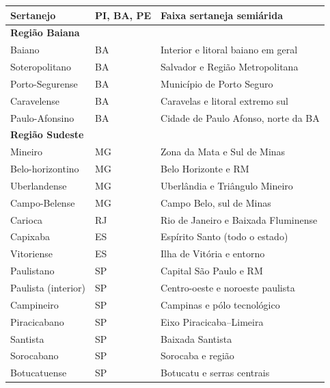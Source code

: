 \begin{table}[ht]
\begin{tabular}{lll}
Sertanejo             & PI, BA, PE          & Faixa sertaneja semiárida          \\
\hline
\multicolumn{3}{l}{\textbf{Região Baiana}} \\ \hline
Baiano          & BA & Interior e litoral baiano em geral      \\
Soteropolitano  & BA & Salvador e Região Metropolitana         \\
Porto-Segurense & BA & Município de Porto Seguro               \\
Caravelense     & BA & Caravelas e litoral extremo sul         \\
Paulo-Afonsino  & BA & Cidade de Paulo Afonso, norte da BA     \\
\hline
\multicolumn{3}{l}{\textbf{Região Sudeste}} \\ \hline
Mineiro           & MG                     & Zona da Mata e Sul de Minas           \\
Belo-horizontino  & MG                     & Belo Horizonte e RM                   \\
Uberlandense      & MG                     & Uberlândia e Triângulo Mineiro        \\
Campo-Belense     & MG                     & Campo Belo, sul de Minas              \\
Carioca           & RJ                     & Rio de Janeiro e Baixada Fluminense   \\
Capixaba          & ES                     & Espírito Santo (todo o estado)        \\
Vitoriense        & ES                     & Ilha de Vitória e entorno             \\
Paulistano        & SP                     & Capital São Paulo e RM                \\
Paulista (interior)& SP                    & Centro-oeste e noroeste paulista      \\
Campineiro        & SP                     & Campinas e pólo tecnológico           \\
Piracicabano      & SP                     & Eixo Piracicaba–Limeira               \\
Santista          & SP                     & Baixada Santista                      \\
Sorocabano        & SP                     & Sorocaba e região                     \\
Botucatuense      & SP                     & Botucatu e serras centrais           \\

\end{tabular}
\end{table}
